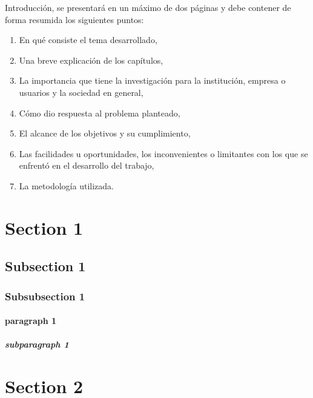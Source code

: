 %
Introducción, se presentará en un máximo de dos páginas y debe contener de forma resumida los siguientes puntos:
	\begin{enumerate}[label=\alph*.]
		\item En qué consiste el tema desarrollado,
		\item Una breve explicación de los capítulos,
		\item La importancia que tiene la investigación para la institución, empresa o usuarios y la sociedad en general,
		\item Cómo dio respuesta al problema planteado,
		\item El alcance de los objetivos y su cumplimiento,
		\item Las facilidades u oportunidades, los inconvenientes o limitantes con los que se enfrentó en el desarrollo del trabajo,
		\item La metodología utilizada.
	\end{enumerate}

\section{Section 1}
	\Blindtext
\subsection{Subsection 1}
	\blindtext
\subsubsection{Subsubsection 1}
	\blindtext
\paragraph{paragraph 1}
	\blindtext
\subparagraph{subparagraph 1}
	\blindtext
\section{Section 2}
	\Blindtext
